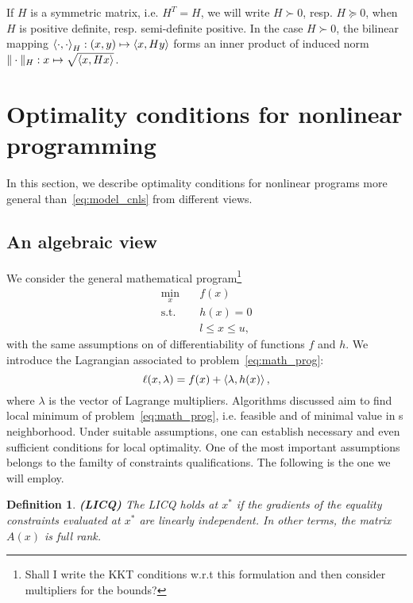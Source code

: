 \documentclass[10pt]{article}
\newtheorem{definition}[theorem]{Definition}
\numberwithin{equation}{section}
\begin{document}
	If $H$ is a symmetric matrix, i.e. $H^T=H$, we will write $H \succ 0$, resp. $H \succeq 0$, when $H$ is positive definite, resp. semi-definite positive. In the case $H\succ 0$, the bilinear mapping $\left\langle {\cdot} , {\cdot} \right\rangle_H:(x,y) \mapsto \left\langle {x} , {Hy} \right\rangle $ forms an inner product of induced norm $\|\cdot\|_H:x\mapsto \sqrt{\left\langle {x} , {Hx} \right\rangle}$.
	
	
	\section{Optimality conditions for nonlinear programming}
	
	In this section, we describe optimality conditions for nonlinear programs more general than~\eqref{eq:model_cnls} from different views.
	
	\subsection{An algebraic view}
	
	We consider the general mathematical program\footnote{Shall I write the KKT conditions w.r.t this formulation and then consider multipliers for the bounds?}
	\begin{equation}
		\label{eq:math_prog}
		\begin{aligned}
			\min_x \quad & f(x) \\
			\text{s.t.} \quad & h(x)=0 \\
			& l \le x \le u,
		\end{aligned}
	\end{equation}
	with the same assumptions on of differentiability of functions $f$ and \(h\). We introduce the Lagrangian associated to problem~\eqref{eq:math_prog}:
	\begin{equation}
		\label{eq:lagrangian}
		\ell(x,\lambda) = f(x) + \left\langle {\lambda} , {h(x)} \right\rangle,
	\end{equation}
	where $\lambda$ is the vector of Lagrange multipliers. Algorithms discussed aim to find local minimum of problem~\eqref{eq:math_prog}, i.e. feasible and of minimal value in s neighborhood. Under suitable assumptions, one can establish necessary and even sufficient conditions for local optimality. One of the most important assumptions belongs to the familty of constraints qualifications. The following is the one we will employ.
	
	\begin{definition}\label{def:licq}
		\textbf{(LICQ)}
		The LICQ holds at $x^*$ if the gradients of the equality constraints evaluated at $x^*$ are linearly independent. In other terms, the matrix $A(x)$ is full rank.
	\end{definition}
	
\end{document}
